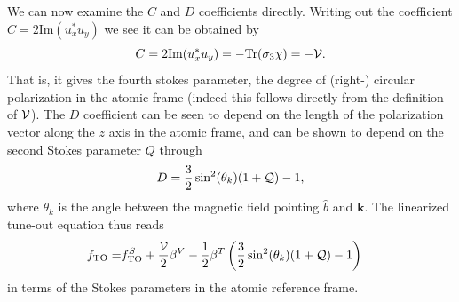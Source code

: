 	We can now examine the $C$ and $D$ coefficients directly.
	Writing out the coefficient $C=2\mathrm{Im}(u_{x}^*u_y)$ we see it can be obtained by 
	\begin{equation}
	C=2\mathrm{Im}(u_{x}^*u_y) = -\mathrm{Tr}(\sigma_3\chi) = -\mathcal{V}.
	\end{equation}
	That is, it gives the fourth stokes parameter, the degree of (right-) circular polarization in the atomic frame (indeed this follows directly from the definition of $\mathcal{V}$).
	The $D$ coefficient can be seen to depend on the length of the polarization vector along the $z$ axis in the atomic frame, and can be shown \cite{Henson22} to depend on the second Stokes parameter $Q$ through
	\begin{equation}
		D = \frac{3}{2}\sin^2(\theta_k)(1+\mathcal{Q}) - 1,
	\end{equation}
	where $\theta_k$ is the angle between the magnetic field pointing $\hat{b}$ and $\mathbf{k}$.
	The linearized tune-out equation thus reads
	\begin{align}
		 f_\mathrm{TO} = & f_\mathrm{TO}^S + \frac{\mathcal{V}}{2}\beta^V - \frac{1}{2}\beta^T \left(\frac{3}{2}\sin^2(\theta_k)(1+\mathcal{Q}) - 1\right)
		 \label{eqn:fto_stokes_eqn}
	\end{align}
	in terms of the Stokes parameters in the atomic reference frame. 




